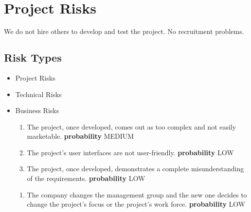 \section{Project Risks}
We do not hire others to develop and test the project.
No recruitment problems.
%
\subsection{Risk Types}
\begin{itemize}
	\item Project Risks
	\item Technical Risks
	\item Business Risks
	\begin{itemize}
		
		
		
		
		\begin{enumerate}
			\item The project, once developed, comes out as too complex and not easily marketable.\newline
			\textbf{probability} MEDIUM
			\item The project's user interfaces are not user-friendly.\newline
			\textbf{probability} LOW
			\item The project, once developed, demonstrates a complete misunderstanding of the requirements.\newline
			\textbf{probability} LOW
		\end{enumerate}
		
		
		\begin{enumerate}
			\item The company changes the management group and the new one decides to change the project's focus or the project's work force.\newline
			\textbf{probability} LOW
		\end{enumerate}
		

\end{itemize}
\end{itemize}
